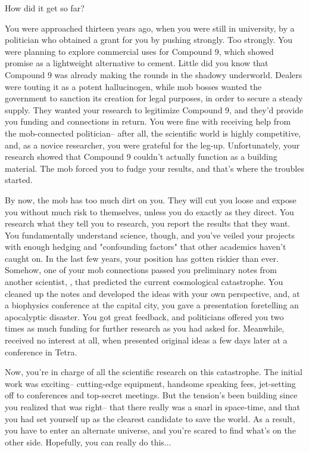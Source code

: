 \documentclass[char]{guildcamp3}
\begin{document}
\name{\cSciOne{}}

How did it get so far?

You were approached thirteen years ago, when you were still in university, by a politician who obtained a grant for you by pushing strongly. Too strongly. You were planning to explore commercial uses for Compound 9, which showed promise as a lightweight alternative to cement. Little did you know that Compound 9 was already making the rounds in the shadowy underworld. Dealers were touting it as a potent hallucinogen, while mob bosses wanted the government to sanction its creation for legal purposes, in order to secure a steady supply. They wanted your research to legitimize Compound 9, and they'd provide you funding and connections in return. You were fine with receiving help from the mob-connected politician-- after all, the scientific world is highly competitive, and, as a novice researcher, you were grateful for the leg-up. Unfortunately, your research showed that Compound 9 couldn't actually function as a building material. The mob forced you to fudge your results, and that's where the troubles started.

By now, the mob has too much dirt on you. They will cut you loose and expose you without much risk to themselves, unless you do exactly as they direct. You research what they tell you to research, you report the results that they want. You fundamentally understand science, though, and you've veiled your projects with enough hedging and "confounding factors" that other academics haven't caught on. In the last few years, your position has gotten riskier than ever. Somehow, one of your mob connections passed you preliminary notes from another scientist, \cSciTwo{}, that predicted the current cosmological catastrophe. You cleaned up the notes and developed the ideas with your own perspective, and, at a biophysics conference at the capital city, you gave a presentation foretelling an apocalyptic disaster. You got great feedback, and politicians offered you two times as much funding for further research as you had asked for. Meanwhile, \cSciTwo{} received no interest at all, when \cSciTwo{\they} presented \cSciTwo{\their} original ideas a few days later at a conference in Tetra.

Now, you're in charge of all the scientific research on this catastrophe. The initial work was exciting-- cutting-edge equipment, handsome speaking fees, jet-setting off to conferences and top-secret meetings. But the tension's been building since you realized that \cSciTwo{} was right-- that there really was a snarl in space-time, and that you had set yourself up as the clearest candidate to save the world. As a result, you have to enter an alternate universe, and you're scared to find what's on the other side. Hopefully, you can really do this...
\end{document}
